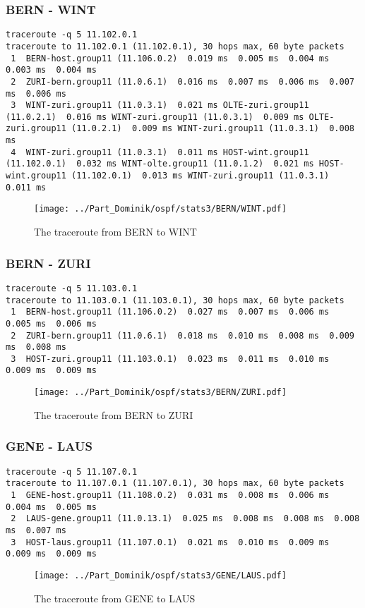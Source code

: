 \subsubsection{BERN - WINT}
\begin{lstlisting}
traceroute -q 5 11.102.0.1
traceroute to 11.102.0.1 (11.102.0.1), 30 hops max, 60 byte packets
 1  BERN-host.group11 (11.106.0.2)  0.019 ms  0.005 ms  0.004 ms  0.003 ms  0.004 ms
 2  ZURI-bern.group11 (11.0.6.1)  0.016 ms  0.007 ms  0.006 ms  0.007 ms  0.006 ms
 3  WINT-zuri.group11 (11.0.3.1)  0.021 ms OLTE-zuri.group11 (11.0.2.1)  0.016 ms WINT-zuri.group11 (11.0.3.1)  0.009 ms OLTE-zuri.group11 (11.0.2.1)  0.009 ms WINT-zuri.group11 (11.0.3.1)  0.008 ms
 4  WINT-zuri.group11 (11.0.3.1)  0.011 ms HOST-wint.group11 (11.102.0.1)  0.032 ms WINT-olte.group11 (11.0.1.2)  0.021 ms HOST-wint.group11 (11.102.0.1)  0.013 ms WINT-zuri.group11 (11.0.3.1)  0.011 ms
\end{lstlisting}
\begin{figure}[H]
\centering
\texttt{[image: ../Part\_Dominik/ospf/stats3/BERN/WINT.pdf]}
\caption{The traceroute from BERN to WINT}
\end{figure}
\clearpage
\subsubsection{BERN - ZURI}
\begin{lstlisting}
traceroute -q 5 11.103.0.1
traceroute to 11.103.0.1 (11.103.0.1), 30 hops max, 60 byte packets
 1  BERN-host.group11 (11.106.0.2)  0.027 ms  0.007 ms  0.006 ms  0.005 ms  0.006 ms
 2  ZURI-bern.group11 (11.0.6.1)  0.018 ms  0.010 ms  0.008 ms  0.009 ms  0.008 ms
 3  HOST-zuri.group11 (11.103.0.1)  0.023 ms  0.011 ms  0.010 ms  0.009 ms  0.009 ms
\end{lstlisting}
\begin{figure}[H]
\centering
\texttt{[image: ../Part\_Dominik/ospf/stats3/BERN/ZURI.pdf]}
\caption{The traceroute from BERN to ZURI}
\end{figure}
\clearpage
\subsubsection{GENE - LAUS}
\begin{lstlisting}
traceroute -q 5 11.107.0.1
traceroute to 11.107.0.1 (11.107.0.1), 30 hops max, 60 byte packets
 1  GENE-host.group11 (11.108.0.2)  0.031 ms  0.008 ms  0.006 ms  0.004 ms  0.005 ms
 2  LAUS-gene.group11 (11.0.13.1)  0.025 ms  0.008 ms  0.008 ms  0.008 ms  0.007 ms
 3  HOST-laus.group11 (11.107.0.1)  0.021 ms  0.010 ms  0.009 ms  0.009 ms  0.009 ms
\end{lstlisting}
\begin{figure}[H]
\centering
\texttt{[image: ../Part\_Dominik/ospf/stats3/GENE/LAUS.pdf]}
\caption{The traceroute from GENE to LAUS}
\end{figure}
\clearpage
